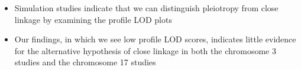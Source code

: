 \documentclass[a0,landscape]{a0poster}
\begin{document}
\begin{multicols}{4}

\begin{itemize}
\item Simulation studies indicate that we can distinguish pleiotropy from close linkage by examining the profile LOD plots
\item Our findings, in which we see low profile LOD scores, indicates little evidence for the alternative hypothesis of close linkage in both the chromosome 3 studies and the chromosome 17 studies
\end{itemize}






\color{DarkSlateGray} %












\end{multicols}
\end{document}
